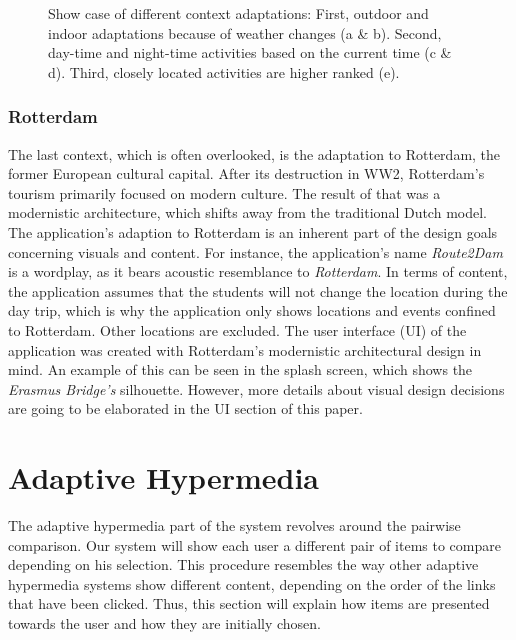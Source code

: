 \documentclass[11pt,a4paper,oneside]{article}
\begin{document}
\begin{figure}[H]
    \caption{Show case of different context adaptations: First, outdoor and indoor adaptations because of weather changes (a \& b). Second, day-time and night-time activities based on the current time (c \& d). Third, closely located activities are higher ranked (e). 
    }%
    \label{fig:adaptions}%
\end{figure}

\subsubsection{Rotterdam}
The last context, which is often overlooked, is the adaptation to Rotterdam, the former European cultural capital.\cite{hitters_SocialPoliticalConstruction_2000} After its destruction in WW2, Rotterdam's tourism primarily focused on modern culture.\cite{rotterdam} The result of that was a modernistic architecture, which shifts away from the traditional Dutch model. The application's adaption to Rotterdam is an inherent part of the design goals concerning visuals and content. For instance, the application's name \emph{Route2Dam} is a wordplay, as it bears acoustic resemblance to \emph{Rotterdam}. In terms of content, the application assumes that the students will not change the location during the day trip, which is why the application only shows locations and events confined to Rotterdam. Other locations are excluded. The user interface (UI) of the application was created with Rotterdam's modernistic architectural design in mind. An example of this can be seen in the splash screen, which shows the \emph{Erasmus Bridge's} silhouette. However, more details about visual design decisions are going to be elaborated in the UI section of this paper.

\section{Adaptive Hypermedia}
\label{sec:adaptive_hm}
The adaptive hypermedia part of the system revolves around the pairwise comparison. Our system will show each user a different pair of items to compare depending on his selection. This procedure resembles the way other adaptive hypermedia systems show different content, depending on the order of the links that have been clicked. Thus, this section will explain how items are presented towards the user and how they are initially chosen. 
\end{document}
